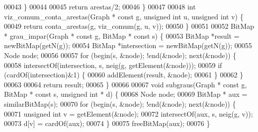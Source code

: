 \begin{DoxyCode}
00043         \}
00044         
00045         \textcolor{keywordflow}{return} arestas/2;
00046 \}
00047 
00048 \textcolor{keywordtype}{int} viz_comum_conta_arestas(Graph * \textcolor{keyword}{const} g, \textcolor{keywordtype}{unsigned} \textcolor{keywordtype}{int} u, \textcolor{keywordtype}{unsigned} \textcolor{keywordtype}{int} v) \{
00049         \textcolor{keywordflow}{return} conta_arestas(g, viz_comum(g, u, v));
00050 \}
00051 
00052 BitMap * grau_impar(Graph * \textcolor{keyword}{const} g, BitMap * \textcolor{keyword}{const} s) \{
00053         BitMap *result = newBitMap(getN(g));
00054         BitMap *intersection = newBitMap(getN(g));
00055         Node node;
00056         
00057         \textcolor{keywordflow}{for} (begin(s, &node); !end(&node); next(&node)) \{
00058                 intersectOf(intersection, s, neig(g, getElement(&node)));
00059                 \textcolor{keywordflow}{if} (cardOf(intersection)&1) \{
00060                         addElement(result, &node);
00061                 \}
00062         \}
00063         
00064         \textcolor{keywordflow}{return} result;
00065 \}
00066 
00067 \textcolor{keywordtype}{void} subgraus(Graph * \textcolor{keyword}{const} g, BitMap * \textcolor{keyword}{const} s, \textcolor{keywordtype}{unsigned} \textcolor{keywordtype}{int} * d) \{
00068     Node node;
00069     BitMap * aux = similarBitMap(s);
00070     \textcolor{keywordflow}{for} (begin(s, &node); !end(&node); next(&node)) \{
00071                 \textcolor{keywordtype}{unsigned} \textcolor{keywordtype}{int} v = getElement(&node);
00072                 intersectOf(aux, s, neig(g, v));
00073                 d[v] = cardOf(aux);
00074     \}
00075     freeBitMap(aux);
00076 \}
\end{DoxyCode}
